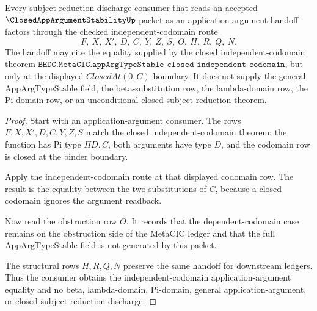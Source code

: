 \begin{theorem}
\label{thm:closed-app-argument-stability-independent-codomain-route}
Every subject-reduction discharge consumer that reads an accepted $\ClosedAppArgumentStabilityUp$ packet as an application-argument handoff factors through the checked independent-codomain route
$$
F,\ X,\ X',\ D,\ C,\ Y,\ Z,\ S,\ O,\ H,\ R,\ Q,\ N .
$$
The handoff may cite the equality supplied by the closed independent-codomain theorem
$\texttt{BEDC.MetaCIC.appArgTypeStable\_closed\_independent\_codomain}$, but only at the displayed $ClosedAt(0,C)$ boundary. It does not supply the general $\mathrm{AppArgTypeStable}$ field, the beta-substitution row, the lambda-domain row, the Pi-domain row, or an unconditional closed subject-reduction theorem.
\end{theorem}
\begin{proof}
Start with an application-argument consumer. The rows $F,X,X',D,C,Y,Z,S$ match the closed independent-codomain theorem: the function has Pi type $\Pi D.\,C$, both arguments have type $D$, and the codomain row is closed at the binder boundary.

Apply the independent-codomain route at that displayed codomain row. The result is the equality between the two substitutions of $C$, because a closed codomain ignores the argument readback.

Now read the obstruction row $O$. It records that the dependent-codomain case remains on the obstruction side of the MetaCIC ledger and that the full $\mathrm{AppArgTypeStable}$ field is not generated by this packet.

The structural rows $H,R,Q,N$ preserve the same handoff for downstream ledgers. Thus the consumer obtains the independent-codomain application-argument equality and no beta, lambda-domain, Pi-domain, general application-argument, or closed subject-reduction discharge.
\end{proof}



